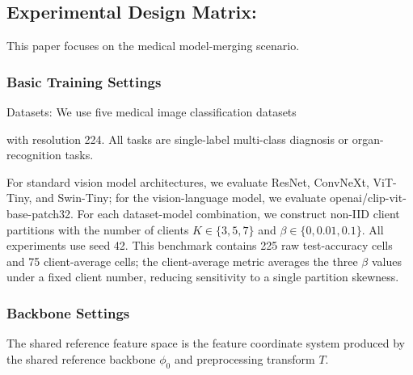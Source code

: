 \documentclass[letterpaper]{article}
\begin{document}
\subsection{Experimental Design Matrix:}

This paper focuses on the medical model-merging scenario.


\subsubsection{Basic Training Settings}

Datasets: We use five medical image classification datasets


with resolution 224. All tasks are single-label multi-class diagnosis or organ-recognition tasks.


For standard vision model architectures, we evaluate ResNet, ConvNeXt, ViT-Tiny, and Swin-Tiny; for the vision-language model, we evaluate openai/clip-vit-base-patch32. For each dataset-model combination, we construct non-IID client partitions with the number of clients $K\in\{3,5,7\}$ and $\beta\in\{0,0.01,0.1\}$. All experiments use seed 42. This benchmark contains 225 raw test-accuracy cells and 75 client-average cells; the client-average metric averages the three $\beta$ values under a fixed client number, reducing sensitivity to a single partition skewness.


\subsubsection{Backbone Settings}

The shared reference feature space is the feature coordinate system produced by the shared reference backbone $\phi_0$ and preprocessing transform $T$.
\end{document}
